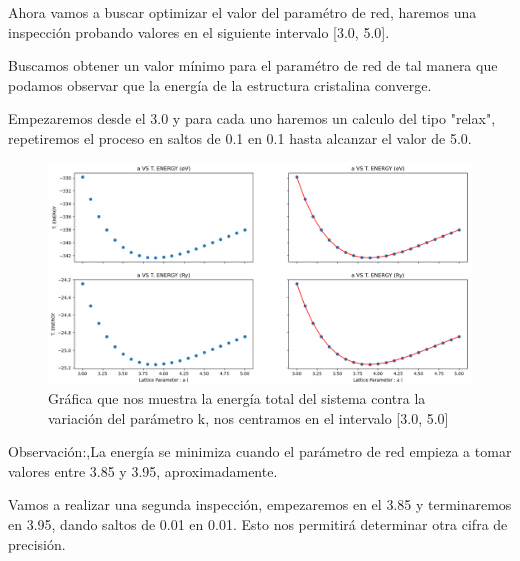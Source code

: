 \vspace{0.5cm}

Ahora vamos a buscar optimizar el valor del paramétro de red, haremos una inspección probando valores
en el siguiente intervalo [3.0, 5.0].
 
\vspace{0.5cm}

Buscamos obtener un valor mínimo para el paramétro de red de tal manera que podamos observar que la energía
de la estructura cristalina converge.

\vspace{0.5cm}

Empezaremos desde el 3.0 y para cada uno haremos un calculo del tipo "relax", repetiremos el proceso
en saltos de 0.1 en 0.1 hasta alcanzar el valor de 5.0.

\begin{figure}[H]
    \centering
    \includegraphics[scale=0.33]{images_silicano/Lattice_parameter_vs_Energy.png}
    \caption{Gráfica que nos muestra la energía total del sistema contra la variación del parámetro k, nos centramos en el intervalo [3.0, 5.0]}
\end{figure}

\vspace{0.5cm}

Observación:,La energía se minimiza cuando el parámetro de red empieza a tomar valores entre 3.85 y 3.95,
aproximadamente.

\vspace{0.5cm}

Vamos a realizar una segunda inspección, empezaremos en el 3.85 y terminaremos en 3.95, dando saltos
de 0.01 en 0.01. Esto nos permitirá determinar otra cifra de precisión.


